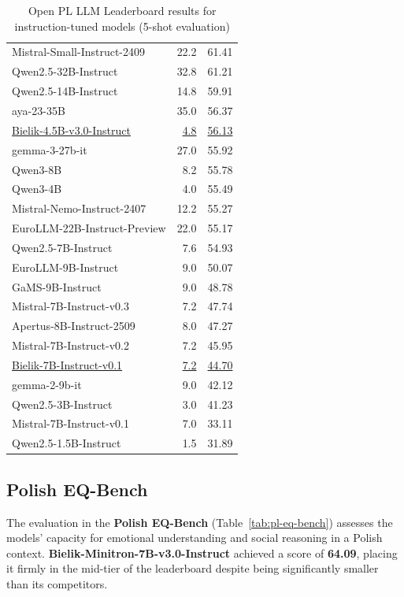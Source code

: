 \documentclass{article}
\begin{document}
\begin{table}[t]
\begin{tabular}{lrr}
    Mistral-Small-Instruct-2409 & 22.2 & 61.41 \\
    Qwen2.5-32B-Instruct & 32.8 & 61.21 \\
    Qwen2.5-14B-Instruct & 14.8 & 59.91 \\
    aya-23-35B & 35.0 & 56.37 \\
    \underline{Bielik-4.5B-v3.0-Instruct} & \underline{4.8} & \underline{56.13} \\
    gemma-3-27b-it & 27.0 & 55.92 \\
    Qwen3-8B & 8.2 & 55.78 \\
    Qwen3-4B & 4.0 & 55.49 \\
    Mistral-Nemo-Instruct-2407 & 12.2 & 55.27 \\
    EuroLLM-22B-Instruct-Preview & 22.0 & 55.17 \\
    Qwen2.5-7B-Instruct & 7.6 & 54.93 \\
    EuroLLM-9B-Instruct & 9.0 & 50.07 \\
    GaMS-9B-Instruct & 9.0 & 48.78 \\
    Mistral-7B-Instruct-v0.3 & 7.2 & 47.74 \\
    Apertus-8B-Instruct-2509 & 8.0 & 47.27 \\
    Mistral-7B-Instruct-v0.2 & 7.2 & 45.95 \\
    \underline{Bielik-7B-Instruct-v0.1} & \underline{7.2} & \underline{44.70} \\
    gemma-2-9b-it & 9.0 & 42.12 \\  
    Qwen2.5-3B-Instruct & 3.0 & 41.23 \\
    Mistral-7B-Instruct-v0.1 &	7.0 &	33.11 \\
    Qwen2.5-1.5B-Instruct & 1.5 & 31.89 \\
    \bottomrule
    \end{tabular}
    \caption{Open PL LLM Leaderboard results for instruction-tuned models (5-shot evaluation)}
    \label{tab:open-pl-llm-instruct}
    \end{table}

\subsection{Polish EQ-Bench}
The evaluation in the \textbf{Polish EQ-Bench} (Table~\ref{tab:pl-eq-bench}) assesses the models' capacity for emotional understanding and social reasoning in a Polish context. \textbf{Bielik-Minitron-7B-v3.0-Instruct} achieved a score of \textbf{64.09}, placing it firmly in the mid-tier of the leaderboard despite being significantly smaller than its competitors.
    
\end{document}

